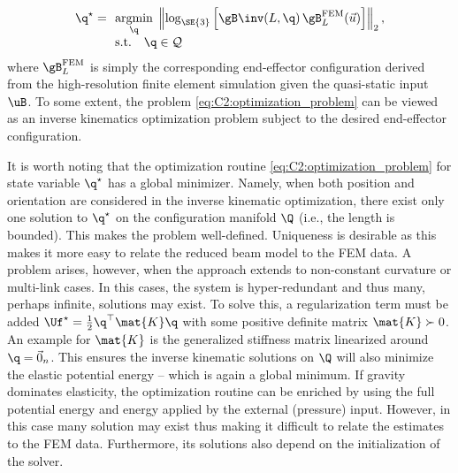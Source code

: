 %
\begin{align}
\begin{array}{ll}
\q^\star = & \!\!\underset{\q}{\textrm{argmin}}\; \left \lVert \log_{\SE{3}}\left[ \gB\inv(L,\q)\,\gB_L^{\textrm{FEM}}(\vec{u}) \right] \right \rVert_2,\\
& \!\!\textrm{s.t.} \quad \q \in \mathcal{Q} 
\end{array}
\label{eq:C2:optimization_problem}
\end{align}
%
where $\gB_L^{\textrm{FEM}}$ is simply the corresponding end-effector configuration derived from the high-resolution finite element simulation given the quasi-static input $\uB$. To some extent, the problem \eqref{eq:C2:optimization_problem} can be viewed as an inverse kinematics optimization problem subject to the desired end-effector configuration.
\vfill

\begin{rmk} 
\editl It is worth noting that the optimization routine \eqref{eq:C2:optimization_problem} for state variable $\q^\star$ has a global minimizer. Namely, when both position and orientation are considered in the inverse kinematic optimization, there exist only one solution to $\q^\star$ on the configuration manifold $\Q$ (i.e., the length is bounded). This makes the problem well-defined. Uniqueness is desirable as this makes it more easy to relate the reduced beam model to the FEM data. A problem arises, however, when the approach extends to non-constant curvature or multi-link cases. In this cases, the system is hyper-redundant and thus many, perhaps infinite, solutions may exist. To solve this, a regularization term must be added $\Uf^\star = \tfrac{1}{2} \q^\top\mat{K}\q$ with some positive definite matrix $\mat{K} \succ 0 $. An example for $\mat{K}$ is the generalized stiffness matrix linearized around $\q = \vec{0}_n$. This ensures the inverse kinematic solutions on $\Q$ will also minimize the elastic potential energy -- which is again a global minimum. If gravity dominates elasticity, the optimization routine can be enriched by using the full potential energy and energy applied by the external (pressure) input. However, in this case many solution may exist thus making it difficult to relate the estimates to the FEM data. Furthermore, its solutions also depend on the initialization of the solver. \editr
  
\end{rmk}

